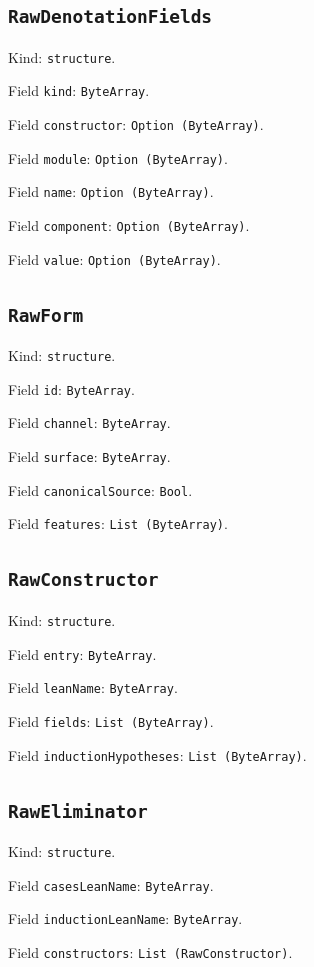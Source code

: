 \documentclass[11pt]{article}
\begin{document}
\subsection*{\texttt{RawDenotationFields}}
\noindent Kind: \texttt{structure}.\par
\noindent Field \texttt{kind}: \texttt{ByteArray}.\par
\noindent Field \texttt{constructor}: \texttt{Option (ByteArray)}.\par
\noindent Field \texttt{module}: \texttt{Option (ByteArray)}.\par
\noindent Field \texttt{name}: \texttt{Option (ByteArray)}.\par
\noindent Field \texttt{component}: \texttt{Option (ByteArray)}.\par
\noindent Field \texttt{value}: \texttt{Option (ByteArray)}.\par
\subsection*{\texttt{RawForm}}
\noindent Kind: \texttt{structure}.\par
\noindent Field \texttt{id}: \texttt{ByteArray}.\par
\noindent Field \texttt{channel}: \texttt{ByteArray}.\par
\noindent Field \texttt{surface}: \texttt{ByteArray}.\par
\noindent Field \texttt{canonicalSource}: \texttt{Bool}.\par
\noindent Field \texttt{features}: \texttt{List (ByteArray)}.\par
\subsection*{\texttt{RawConstructor}}
\noindent Kind: \texttt{structure}.\par
\noindent Field \texttt{entry}: \texttt{ByteArray}.\par
\noindent Field \texttt{leanName}: \texttt{ByteArray}.\par
\noindent Field \texttt{fields}: \texttt{List (ByteArray)}.\par
\noindent Field \texttt{inductionHypotheses}: \texttt{List (ByteArray)}.\par
\subsection*{\texttt{RawEliminator}}
\noindent Kind: \texttt{structure}.\par
\noindent Field \texttt{casesLeanName}: \texttt{ByteArray}.\par
\noindent Field \texttt{inductionLeanName}: \texttt{ByteArray}.\par
\noindent Field \texttt{constructors}: \texttt{List (RawConstructor)}.\par
\end{document}
